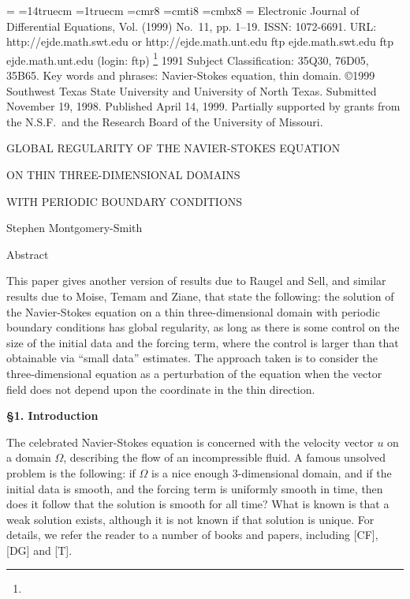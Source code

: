\magnification = \magstephalf
\hsize=14truecm
\hoffset=1truecm
\parskip=5pt
\nopagenumbers 
\overfullrule=0pt
\font\eightrm=cmr8 \font\eighti=cmti8 \font\eightbf=cmbx8
\headline={\ifnum{} \hfill\else%
{\tenrm\ifodd\pageno\rightheadline \else
\leftheadline\fi}\fi}
%
\def\rightheadline{EJDE--1999/11\hfil Navier-Stokes equation \hfil\folio}
\def\leftheadline{\folio\hfil Stephen Montgomery-Smith \hfil EJDE--1999/11}
\baselineskip
\vbox {\eightrm\noindent\baselineskip 9pt %
 Electronic Journal of Differential Equations,
Vol. {}(1999) No.~11, pp. 1--19.\hfill\break
ISSN: 1072-6691. URL: http://ejde.math.swt.edu or http://ejde.math.unt.edu
\hfil\break ftp  ejde.math.swt.edu \quad ftp ejde.math.unt.edu (login: ftp)}
\footnote{}{\vbox{\hsize=10cm\eightrm\noindent\baselineskip 9pt %
1991 {\eighti Subject Classification:} 35Q30, 76D05, 35B65.
\hfil\break
{\eighti Key words and phrases:} Navier-Stokes equation, thin domain.
\hfil\break
\copyright 1999 Southwest Texas State University  and
University of North Texas.\hfil\break
Submitted November 19, 1998. Published April 14, 1999.\hfil\break
Partially supported by grants from the N.S.F.\
and the Research Board of the University of Missouri.} }

\bigskip\bigskip

\centerline{GLOBAL REGULARITY OF THE NAVIER-STOKES EQUATION }
\centerline{ON THIN THREE-DIMENSIONAL DOMAINS }
\centerline{WITH PERIODIC BOUNDARY CONDITIONS }
\medskip
\centerline{Stephen Montgomery-Smith}
\bigskip\bigskip

{\eightrm\baselineskip=10pt \narrower
\centerline{\eightbf Abstract}
This paper gives another version of results due to Raugel and Sell, and 
similar results due to Moise, Temam and Ziane, that state the following: 
the solution of the Navier-Stokes equation on a thin three-dimensional 
domain with periodic boundary conditions has global regularity, as long as
there is some control on the size of the initial data and the forcing
term, where the control is larger than that obtainable via ``small
data'' estimates.  The approach taken is to consider the three-dimensional
equation as a perturbation of the equation when the vector field does
not depend upon the coordinate in the thin direction.
\bigskip}

\def\modo#1{{\left|#1\right|}}
\def\normo#1{{\mathopen\|#1\mathclose\|}}

\bigbreak
\centerline{\bf \S 1. Introduction} \medskip\nobreak
The celebrated Navier-Stokes equation is concerned with the
velocity vector $u$ on a domain $\Omega$, describing the flow
of an incompressible fluid.  A famous unsolved problem is
the following: if $\Omega$ is a nice enough
3-dimensional domain, and if
the initial data is smooth, and the forcing term is uniformly 
smooth in time, then does it follow that the solution is
smooth for all time?  What is known is that a weak solution
exists, although it is not known if that solution is unique.
For details, we refer the reader to a number of books and
papers, including [CF], [DG] and [T].


